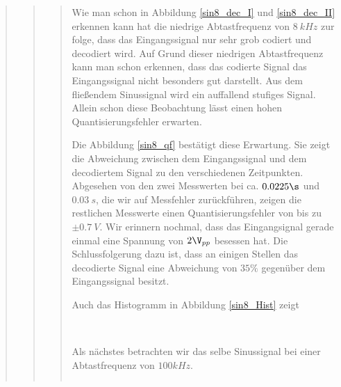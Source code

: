 \begin{quote}
\begin{quote}
\begin{quote}
            Wie man schon in Abbildung \ref{sin8_dec_I} und \ref{sin8_dec_II} erkennen kann hat die niedrige
            Abtastfrequenz von $8 \ kHz$ zur folge, dass das Eingangssignal nur sehr grob codiert und decodiert wird.
            Auf Grund dieser niedrigen Abtastfrequenz kann man schon erkennen, dass das codierte Signal das Eingangssignal
            nicht besonders gut darstellt. Aus dem fließendem Sinussignal wird ein auffallend stufiges Signal.\\
            Allein schon diese Beobachtung lässt einen hohen Quantisierungsfehler erwarten.\vspace{1em}
            
            Die Abbildung \ref{sin8_qf} bestätigt diese Erwartung. Sie zeigt die Abweichung zwischen dem Eingangssignal
            und dem decodiertem Signal zu den verschiedenen Zeitpunkten. Abgesehen von den zwei Messwerten bei ca.
            $0.0225 \s$ und $0.03 \ s$, die wir auf Messfehler zurückführen, zeigen die restlichen Messwerte einen
            Quantisierungsfehler von bis zu $\pm 0.7 \ V$. Wir erinnern nochmal, dass das Eingangsignal gerade einmal
            eine Spannung von $2 \V_{pp}$ besessen hat. Die Schlussfolgerung dazu ist, dass an einigen Stellen das
            decodierte Signal eine Abweichung von $35 \%$ gegenüber dem Eingangssignal besitzt.\vspace{1em}
            
            Auch das Histogramm in Abbildung \ref{sin8_Hist} zeigt 
            
            
            \\
            
            
            
            \vspace{1em}
            
            Als nächstes betrachten wir das selbe Sinussignal bei einer Abtastfrequenz von $100 kHz$. 
    
            \begin{center}
                \begin{tabular}{ll}
                

\end{tabular}
\end{center}
\end{quote}
\end{quote}
\end{quote}
